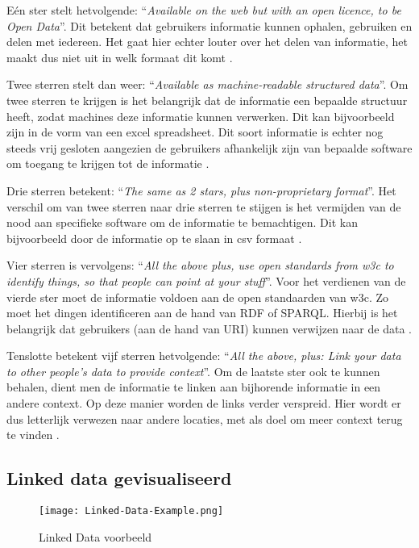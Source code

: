Eén ster stelt hetvolgende: ``\textit{Available on the web but with an open licence, to be Open Data}''. Dit betekent dat gebruikers informatie kunnen ophalen, gebruiken en delen met iedereen. Het gaat hier echter louter over het delen van informatie, het maakt dus niet uit in welk formaat dit komt \cite{berners2006linkeddata}. 

Twee sterren stelt dan weer: ``\textit{Available as machine-readable structured data}''. Om twee sterren te krijgen is het belangrijk dat de informatie een bepaalde structuur heeft, zodat machines deze informatie kunnen verwerken. Dit kan bijvoorbeeld zijn in de vorm van een excel spreadsheet. Dit soort informatie is echter nog steeds vrij gesloten aangezien de gebruikers afhankelijk zijn van bepaalde software om toegang te krijgen tot de informatie \cite{berners2006linkeddata}.

Drie sterren betekent: ``\textit{The same as 2 stars, plus non-proprietary format}''. Het verschil om van twee sterren naar drie sterren te stijgen is het vermijden van de nood aan specifieke software om de informatie te bemachtigen. Dit kan bijvoorbeeld door de informatie op te slaan in \acrfull{csv} formaat \cite{berners2006linkeddata}.

Vier sterren is vervolgens: ``\textit{All the above plus, use open standards from \acrshort{w3c} to identify things, so that people can point at your stuff}''. Voor het verdienen van de vierde ster moet de informatie voldoen aan de open standaarden van \acrshort{w3c}. Zo moet het dingen identificeren aan de hand van RDF of SPARQL. Hierbij is het belangrijk dat gebruikers (aan de hand van URI) kunnen verwijzen naar de data \cite{berners2006linkeddata}.

Tenslotte betekent vijf sterren hetvolgende: ``\textit{All the above, plus: Link your data to other people’s data to provide context}''. Om de laatste ster ook te kunnen behalen, dient men de informatie te linken aan bijhorende informatie in een andere context. Op deze manier worden de links verder verspreid. Hier wordt er dus letterlijk verwezen naar andere locaties, met als doel om meer context terug te vinden \cite{berners2006linkeddata}.

\subsection{Linked data gevisualiseerd}

\begin{figure}[ht!]
    \centering
    \texttt{[image: Linked-Data-Example.png]}
    \caption{Linked Data voorbeeld}
    \label{fig:linked_data_example}
\end{figure}

